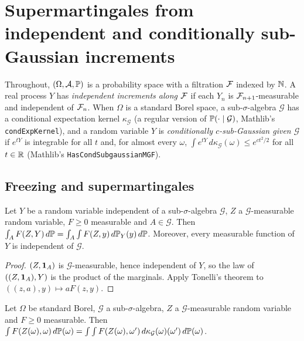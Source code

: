 \chapter{Supermartingales from independent and conditionally sub-Gaussian increments}
\label{chap:pre_martingale}

Throughout, $(\Omega, \mathcal A, \mathbb{P})$ is a probability space with a filtration $\mathcal{F}$ indexed by
$\mathbb{N}$. A real process $Y$ has \emph{independent increments along $\mathcal{F}$} if each $Y_n$ is
$\mathcal{F}_{n+1}$-measurable and independent of $\mathcal{F}_n$. When $\Omega$ is a standard Borel space, a
sub-$\sigma$-algebra $\mathcal G$ has a conditional expectation kernel $\kappa_{\mathcal G}$ (a
regular version of $\mathbb{P}(\cdot \mid \mathcal G)$, Mathlib's \texttt{condExpKernel}), and a random
variable $Y$ is \emph{conditionally $c$-sub-Gaussian given $\mathcal G$} if $e^{tY}$ is integrable
for all $t$ and, for almost every $\omega$, $\int e^{tY} \, d\kappa_{\mathcal G}(\omega) \le
e^{ct^2/2}$ for all $t \in \mathbb{R}$ (Mathlib's \texttt{HasCondSubgaussianMGF}).

\section{Freezing and supermartingales}

\begin{lemma}
  \label{lem:lintegral_comp_indep}
  \leanok
  Let $Y$ be a random variable independent of a sub-$\sigma$-algebra $\mathcal G$, $Z$ a
  $\mathcal G$-measurable random variable, $F \ge 0$ measurable and $A \in \mathcal G$. Then
  $\int_A F(Z, Y) \, d\mathbb{P} = \int_A \int F(Z, y) \, d\mathbb{P}_Y(y) \, d\mathbb{P}$. Moreover, every
  measurable function of $Y$ is independent of $\mathcal G$.
\end{lemma}

\begin{proof}
  \leanok
  $(Z, \mathbf{1}_A)$ is $\mathcal G$-measurable, hence independent of $Y$, so the law of
  $((Z, \mathbf{1}_A), Y)$ is the product of the marginals. Apply Tonelli's theorem to
  $((z, a), y) \mapsto a F(z, y)$.
\end{proof}

\begin{lemma}
  \label{lem:lintegral_comp_condExpKernel}
  \leanok
  Let $\Omega$ be standard Borel, $\mathcal G$ a sub-$\sigma$-algebra, $Z$ a $\mathcal G$-measurable
  random variable and $F \ge 0$ measurable. Then
  $\int F(Z(\omega), \omega) \, d\mathbb{P}(\omega) = \int \int F(Z(\omega), \omega') \,
  d\kappa_{\mathcal G}(\omega)(\omega') \, d\mathbb{P}(\omega)$.
\end{lemma}

